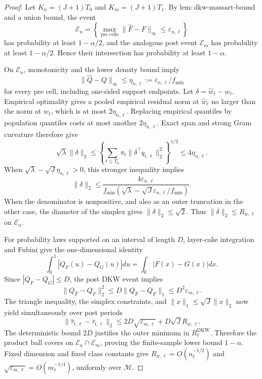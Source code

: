 \documentclass{article}
\begin{document}
\begin{proof}
Let \(K_n=(J+1)T_0\) and \(K_m=(J+1)T_1\).  By \(\mathrm{lem:dkw\mbox{-}massart\mbox{-}bound}\) and a union bound, the event
\[
 \mathcal E_n=\left\{\max_{\text{pre cells}}
 \|\widehat F-F\|_\infty\leq\varepsilon_{n,\ell}\right\}
\]
has probability at least \(1-\alpha/2\), and the analogous post event \(\mathcal E_m\) has probability at least \(1-\alpha/2\).  Hence their intersection has probability at least \(1-\alpha\).

On \(\mathcal E_n\), monotonicity and the lower density bound imply
\[
 \|\widehat Q-Q\|_\infty\leq
 \eta_{n,\ell}:=\varepsilon_{n,\ell}/f_{\min}
\]
for every pre cell, including one-sided support endpoints.  Let \(\delta=\widehat w_\ell-w_\ell\).  Empirical optimality gives a pooled empirical residual norm at \(\widehat w_\ell\) no larger than the norm at \(w_\ell\), which is at most \(2\eta_{n,\ell}\).  Replacing empirical quantiles by population quantiles costs at most another \(2\eta_{n,\ell}\).  Exact span and strong Gram curvature therefore give
\[
 \sqrt\lambda\|\delta\|_2
 \leq\left\{\sum_{t\leq T_0}\pi_t
 \|\delta^\top q_{t,\ell}\|_2^2\right\}^{1/2}
 \leq4\eta_{n,\ell}.
\]
When \(\sqrt\lambda-\sqrt J\eta_{n,\ell}>0\), this stronger inequality implies
\[
 \|\delta\|_2\leq
 \frac{4\varepsilon_{n,\ell}}
 {f_{\min}(\sqrt\lambda-\sqrt J\varepsilon_{n,\ell}/f_{\min})}.
\]
When the denominator is nonpositive, and also as an outer truncation in the other case, the diameter of the simplex gives \(\|\delta\|_2\leq\sqrt2\).  Thus \(\|\delta\|_2\leq R_{w,\ell}\) on \(\mathcal E_n\).

For probability laws supported on an interval of length \(D\), layer-cake integration and Fubini give the one-dimensional identity
\[
 \int_0^1|Q_F(u)-Q_G(u)|du
 =\int_{\mathbb R}|F(x)-G(x)|dx.
\]
Since \(|Q_F-Q_G|\leq D\), the post DKW event implies
\[
 \|Q_{\widehat F}-Q_F\|_2^2
 \leq D\|Q_{\widehat F}-Q_F\|_1
 \leq D^2\varepsilon_{m,\ell}.
\]
The triangle inequality, the simplex constraints, and
\(\|x\|_1\leq\sqrt J\|x\|_2\) now yield simultaneously over post periods
\[
 \|\widehat\tau_{t,\ell}-\tau_{t,\ell}\|_2
 \leq2D\sqrt{\varepsilon_{m,\ell}}+D\sqrt J R_{w,\ell}.
\]
The deterministic bound \(2D\) justifies the outer minimum in
\(R^{\mathrm{DKW}}_\ell\).  Therefore the product ball covers on
\(\mathcal E_n\cap\mathcal E_m\), proving the finite-sample lower bound \(1-\alpha\).  Fixed dimension and fixed class constants give
\(R_{w,\ell}=O(n_\ell^{-1/2})\) and
\(\sqrt{\varepsilon_{m,\ell}}=O(m_\ell^{-1/4})\), uniformly over \(\mathcal M\).


\end{proof}
\end{document}
